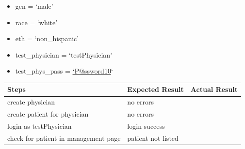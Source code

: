 \documentclass[letterpaper,10pt,english]{sphinxmanual}
\begin{document}
\begin{fulllineitems}
\begin{itemize}
\item {} 
gen = `male'

\item {} 
race = `white'

\item {} 
eth = `non\_hispanic'

\item {} 
test\_physician = `testPhysician'

\item {} 
test\_phys\_pass = \href{mailto:'P@ssword10}{`P@ssword10}`

\end{itemize}

\begin{tabulary}{\linewidth}{|L|L|L|}
\hline
\textsf{\relax 
Steps
} & \textsf{\relax 
Expected Result
} & \textsf{\relax 
Actual Result
}\\
\hline
create physician
 & 
no errors
 & \\
\hline
create patient for physician
 & 
no errors
 & \\
\hline
login as testPhysician
 & 
login success
 & \\
\hline
check for patient in management page
 & 
patient not listed
 & \\
\hline\end{tabulary}


\end{fulllineitems}

\end{document}
